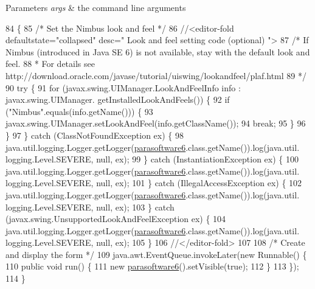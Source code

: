 \begin{DoxyParams}{Parameters}
{\em args} & the command line arguments \\
\hline
\end{DoxyParams}

\begin{DoxyCode}
84                                            \{
85         \textcolor{comment}{/* Set the Nimbus look and feel */}
86         \textcolor{comment}{//<editor-fold defaultstate="collapsed" desc=" Look and feel setting code (optional) ">}
87         \textcolor{comment}{/* If Nimbus (introduced in Java SE 6) is not available, stay with the default look and feel.}
88 \textcolor{comment}{         * For details see http://download.oracle.com/javase/tutorial/uiswing/lookandfeel/plaf.html }
89 \textcolor{comment}{         */}
90         \textcolor{keywordflow}{try} \{
91             \textcolor{keywordflow}{for} (javax.swing.UIManager.LookAndFeelInfo info : javax.swing.UIManager.
      getInstalledLookAndFeels()) \{
92                 \textcolor{keywordflow}{if} (\textcolor{stringliteral}{"Nimbus"}.equals(info.getName())) \{
93                     javax.swing.UIManager.setLookAndFeel(info.getClassName());
94                     \textcolor{keywordflow}{break};
95                 \}
96             \}
97         \} \textcolor{keywordflow}{catch} (ClassNotFoundException ex) \{
98             java.util.logging.Logger.getLogger(\mbox{\hyperlink{classsoftware_1_1parasoftware6_a6fb366aeceab3c73f162d273e6b2565e}{parasoftware6}}.class.getName()).log(java.util.
      logging.Level.SEVERE, null, ex);
99         \} \textcolor{keywordflow}{catch} (InstantiationException ex) \{
100             java.util.logging.Logger.getLogger(\mbox{\hyperlink{classsoftware_1_1parasoftware6_a6fb366aeceab3c73f162d273e6b2565e}{parasoftware6}}.class.getName()).log(java.util.
      logging.Level.SEVERE, null, ex);
101         \} \textcolor{keywordflow}{catch} (IllegalAccessException ex) \{
102             java.util.logging.Logger.getLogger(\mbox{\hyperlink{classsoftware_1_1parasoftware6_a6fb366aeceab3c73f162d273e6b2565e}{parasoftware6}}.class.getName()).log(java.util.
      logging.Level.SEVERE, null, ex);
103         \} \textcolor{keywordflow}{catch} (javax.swing.UnsupportedLookAndFeelException ex) \{
104             java.util.logging.Logger.getLogger(\mbox{\hyperlink{classsoftware_1_1parasoftware6_a6fb366aeceab3c73f162d273e6b2565e}{parasoftware6}}.class.getName()).log(java.util.
      logging.Level.SEVERE, null, ex);
105         \}
106         \textcolor{comment}{//</editor-fold>}
107 
108         \textcolor{comment}{/* Create and display the form */}
109         java.awt.EventQueue.invokeLater(\textcolor{keyword}{new} Runnable() \{
110             \textcolor{keyword}{public} \textcolor{keywordtype}{void} run() \{
111                 \textcolor{keyword}{new} \mbox{\hyperlink{classsoftware_1_1parasoftware6_a6fb366aeceab3c73f162d273e6b2565e}{parasoftware6}}().setVisible(\textcolor{keyword}{true});
112             \}
113         \});
114     \}
\end{DoxyCode}


